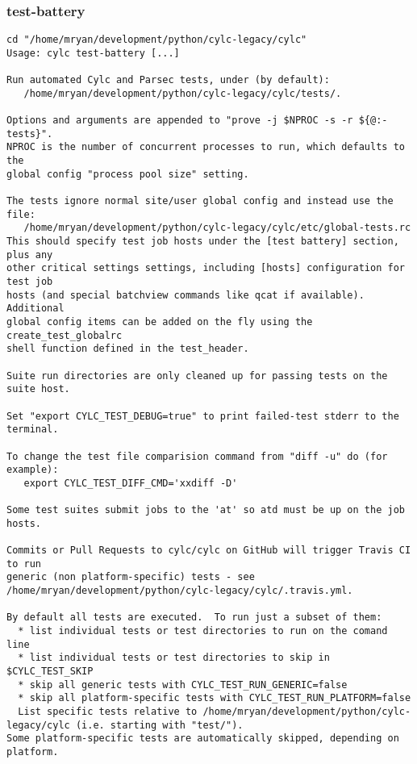 \subsubsection{test-battery}
\label{test-battery}
\begin{lstlisting}
cd "/home/mryan/development/python/cylc-legacy/cylc"
Usage: cylc test-battery [...]

Run automated Cylc and Parsec tests, under (by default):
   /home/mryan/development/python/cylc-legacy/cylc/tests/.

Options and arguments are appended to "prove -j $NPROC -s -r ${@:-tests}".
NPROC is the number of concurrent processes to run, which defaults to the
global config "process pool size" setting.

The tests ignore normal site/user global config and instead use the file:
   /home/mryan/development/python/cylc-legacy/cylc/etc/global-tests.rc
This should specify test job hosts under the [test battery] section, plus any
other critical settings settings, including [hosts] configuration for test job
hosts (and special batchview commands like qcat if available). Additional
global config items can be added on the fly using the create_test_globalrc
shell function defined in the test_header.

Suite run directories are only cleaned up for passing tests on the suite host.

Set "export CYLC_TEST_DEBUG=true" to print failed-test stderr to the terminal.

To change the test file comparision command from "diff -u" do (for example):
   export CYLC_TEST_DIFF_CMD='xxdiff -D'

Some test suites submit jobs to the 'at' so atd must be up on the job hosts.

Commits or Pull Requests to cylc/cylc on GitHub will trigger Travis CI to run
generic (non platform-specific) tests - see /home/mryan/development/python/cylc-legacy/cylc/.travis.yml.

By default all tests are executed.  To run just a subset of them:
  * list individual tests or test directories to run on the comand line
  * list individual tests or test directories to skip in $CYLC_TEST_SKIP
  * skip all generic tests with CYLC_TEST_RUN_GENERIC=false
  * skip all platform-specific tests with CYLC_TEST_RUN_PLATFORM=false
  List specific tests relative to /home/mryan/development/python/cylc-legacy/cylc (i.e. starting with "test/").
Some platform-specific tests are automatically skipped, depending on platform.


\end{lstlisting}
